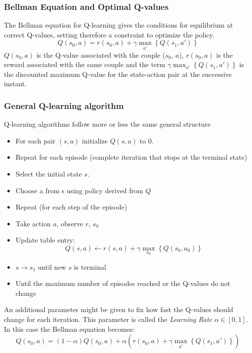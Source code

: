 \subsubsection{Bellman Equation and Optimal Q-values}

The Bellman equation for Q-learning gives the conditions for equilibrium at correct Q-values, setting therefore a constraint to optimize the policy.
\begin{equation}
Q(s_{0}, a) = r(s_{0},a ) + \gamma  \max_{a'}\left\{Q(s_1, a')\right\}
\end{equation}
$Q(s_{0}, a)$ is the Q-value associated with the couple ($s_{0}$, $a$), $r(s_{0},a )$ is the reward associated with the same couple and the term $\gamma \max_{a'}\left\{Q(s_1, a')\right\}$ is the discounted maximum Q-value for the state-action pair at the successive instant.

\subsubsection{General Q-learning algorithm} \label{GQL}

Q-learning algorithms follow more or less the same general structure
\begin{itemize}
    \item For each pair $(s, a)$ initialize $Q(s, a)$ to 0.
    \item Repeat for each episode (complete iteration that stops at the terminal state)
    \item Select the initial state $s$.
    \item Choose a from s using policy derived from $Q$
    \item Repeat (for each step of the episode)
    \item Take action $a$, observe $r$, $s_{0}$ 
    \item Update table entry: $$Q(s,a) \leftarrow r(s,a) + \gamma \max_{a_{0}}\left\{Q(s_{0},a_{0})\right\}$$
    \item $s \rightarrow{} s_{1}$ until new $s$ is terminal
    \item Until the maximum number of episodes reached or the Q-values do not change
\end{itemize}

An additional parameter might be given to fix how fast the Q-values should change for each iteration.
This parameter is called the \emph{Learning Rate} $\alpha \in [0,1]$. In this case the Bellman equation becomes:
\begin{equation}
Q(s_{0}, a) = (1-\alpha)Q(s_{0}, a) + \alpha \left(r(s_{0},a ) + \gamma  \max_{a'}\left\{Q(s_1, a')\right\}\right) 
\end{equation}

